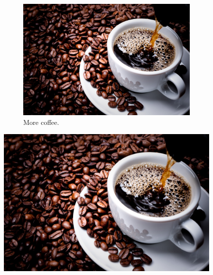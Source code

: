 \documentclass{article}
\begin{document}
\begin{figure}[h!]
\begin{subfigure}[b]{0.2\linewidth}
			\includegraphics[width=\line]{coffe.jpg}
			\caption{More coffee.}
		\end{subfigure}
		\includegraphics[width=\linewidth]{coffe.jpg}
		\caption{ Tasty Coffee.}
			\begin{subfigure}[b]{0.2\linewidth}
			

\end{subfigure}
\end{figure}
\end{document}
